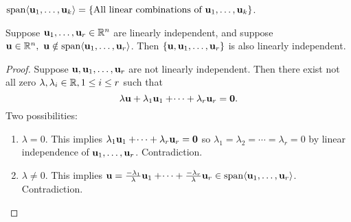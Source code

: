 \documentclass[10pt, a4paper]{article}
\begin{document}
$\mathrm{span}\langle\mathbf{u}_1, \dotsc, \mathbf{u}_k\rangle = \{\text{All linear combinations of }\mathbf{u}_1, \dotsc, \mathbf{u}_k\}$.

\begin{proposition}
    Suppose $\mathbf{u}_1, \dotsc, \mathbf{u}_r \in \mathbb{R} ^ n$ are linearly independent,
    and suppose $\mathbf{u} \in \mathbb{R} ^ n,\ \mathbf{u} \notin \mathrm{span}\langle\mathbf{u}_1, \dotsc, \mathbf{u}_r\rangle$.
    Then $\{\mathbf{u}, \mathbf{u}_1, \dotsc, \mathbf{u}_r\}$ is also linearly independent.
    \begin{proof}
        Suppose $\mathbf{u}, \mathbf{u}_1, \dotsc, \mathbf{u}_r$ are not linearly independent.
        Then there exist not all zero $\lambda, \lambda_i \in \mathbb{R}, 1 \leq i \leq r$
        such that
        \[
        \lambda\mathbf{u} + \lambda_1\mathbf{u}_1 + \dotsi + \lambda_r\mathbf{u}_r = \mathbf{0}.
        \]
        Two possibilities:
        \begin{enumerate}[label = (\arabic*)]
            \item $\lambda = 0$.
            This implies $\lambda_1\mathbf{u}_1 + \dotsi + \lambda_r\mathbf{u}_r = \mathbf{0}$ so $\lambda_1 = \lambda_2 = \dotsi = \lambda_r = 0$ by linear independence of $\mathbf{u}_1, \dotsc, \mathbf{u}_r$.
            Contradiction.
            \item $\lambda \neq 0$.
            This implies $\mathbf{u} = \frac{-\lambda_1}{\lambda}\mathbf{u}_1 + \dotsi + \frac{-\lambda_r}{\lambda}\mathbf{u}_r \in \mathrm{span}\langle\mathbf{u}_1, \dotsc, \mathbf{u}_r\rangle$.
            Contradiction.
        \end{enumerate}
    \end{proof}
\end{proposition}
\end{document}
